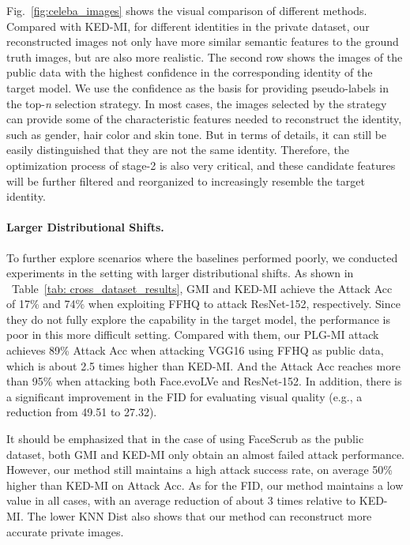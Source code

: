 \documentclass[letterpaper]{article} %
\newcommand{\Tref}[1]{Table~\ref{#1}}
\newcommand{\Fref}[1]{Fig.~\ref{#1}}
\begin{document}
\Fref{fig:celeba_images} shows the visual comparison of different methods. Compared with KED-MI, for different identities in the private dataset, our reconstructed images not only have more similar semantic features to the ground truth images, but are also more realistic. The second row shows the images of the public data with the highest confidence in the corresponding identity of the target model. We use the confidence as the basis for providing pseudo-labels in the top-\emph{n} selection strategy. In most cases, the images selected by the strategy can provide some of the characteristic features needed to reconstruct the identity, such as gender, hair color and skin tone. But in terms of details, it can still be easily distinguished that they are not the same identity. Therefore, the optimization process of stage-2 is also very critical, and these candidate features will be further filtered and reorganized to increasingly resemble the target identity.



\paragraph{Larger Distributional Shifts.}
To further explore scenarios where the baselines performed poorly, we conducted experiments in the setting with larger distributional shifts. As shown in ~\Tref{tab: cross_dataset_results}, GMI and KED-MI achieve the Attack Acc of 17\% and 74\% when exploiting FFHQ to attack ResNet-152, respectively. Since they do not fully explore the capability in the target model, the performance is poor in this more difficult setting. Compared with them, our PLG-MI attack achieves 89\% Attack Acc when attacking VGG16 using FFHQ as public data, which is about 2.5 times higher than KED-MI. And the Attack Acc reaches more than 95\% when attacking both Face.evoLVe and ResNet-152. In addition, there is a significant improvement in the FID for evaluating visual quality (e.g., a reduction from 49.51 to 27.32).

It should be emphasized that in the case of using FaceScrub as the public dataset, both GMI and KED-MI only obtain an almost failed attack performance. However, our method still maintains a high attack success rate, on average 50\% higher than KED-MI on Attack Acc. As for the FID, our method maintains a low value in all cases, with an average reduction of about 3 times relative to KED-MI. The lower KNN Dist also shows that our method can reconstruct more accurate private images.
\end{document}
